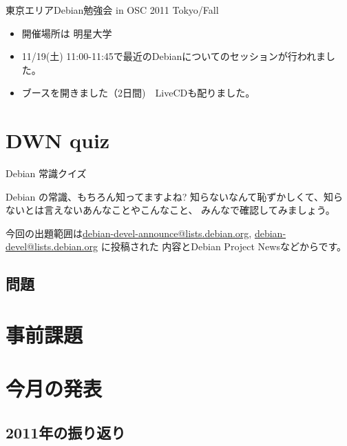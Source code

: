
\begin{frame}{東京エリアDebian勉強会 in OSC 2011 Tokyo/Fall}
\begin{itemize}
\item 開催場所は 明星大学
\item 11/19(土) 11:00-11:45で最近のDebianについてのセッションが行われました。
\item ブースを開きました（2日間)　LiveCDも配りました。
\end{itemize}
\end{frame}

\section{DWN quiz}
\begin{frame}{Debian 常識クイズ}

Debian の常識、もちろん知ってますよね?
知らないなんて恥ずかしくて、知らないとは言えないあんなことやこんなこと、
みんなで確認してみましょう。

今回の出題範囲は\url{debian-devel-announce@lists.debian.org},
\url{debian-devel@lists.debian.org} に投稿された
内容とDebian Project Newsなどからです。

\end{frame}

\subsection{問題}


\section{事前課題}
{\footnotesize
 
}
\section{今月の発表}
\subsection{2011年の振り返り}

